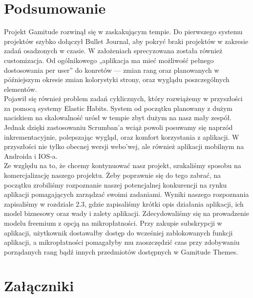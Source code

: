 \documentclass[a4paper,11pt]{report}
\begin{document}
\chapter {Podsumowanie}
Projekt Gamitude rozwinął się w zaskakującym tempie.
Do pierwszego systemu projektów szybko dołączył Bullet Journal, aby pokryć braki projektów w zakresie zadań osadzonych w czasie.
W założeniach sprecyzowana została również customizacja. Od ogólnikowego „aplikacja ma mieć możliwość pełnego dostosowania per user” do konretów 
— zmian rang oraz planowanych w późniejszym okresie zmian kolorystyki strony, oraz wyglądu poszczególnych elementów.\\
Pojawił się również problem zadań cyklicznych, który rozwiążemy w przyszłości za pomocą systemy Elastic Habits.
System od początku planowany z dużym naciskiem na skalowalność urósł w tempie zbyt dużym na nasz mały zespół.
Jednak dzięki zastosowaniu Scrumban'a wciąż powoli posuwamy się naprzód inkrementacyjnie, polepszając wygląd, oraz komfort korzystania z aplikacji.
W przyszłości nie tylko obecnej wersji webo'wej, ale również aplikacji mobilnym na Androida i IOS-a.\\
Ze względu na to, że chcemy kontynuować nasz projekt, szukaliśmy sposobu na komercjalizację naszego projektu.
Żeby poprawnie się do tego zabrać, na początku zrobiliśmy rozpoznanie naszej potencjalnej konkurencji na rynku aplikacji pomagających zarządzać swoimi zadaniami.
Wyniki naszego rozpoznania zapisaliśmy w rozdziale 2.3, gdzie zapisaliśmy krótki opis działania aplikacji, ich model biznesowy oraz wady i zalety aplikacji.
Zdecydowaliśmy się na prowadzenie modelu freemium\cite{freemium} z opcją na mikropłatności. 
Przy zakupie subskrypcji w aplikacji, użytkownik dostawałby dostęp do wcześniej zablokowanych funkcji aplikacji, a mikropłatności pomagałyby mu zaoszczędzić czas przy zdobywaniu porządanych rang bądź innych przedmiotów dostępnych w Gamitude Themes.

 


\chapter {Załączniki}
\end{document}
